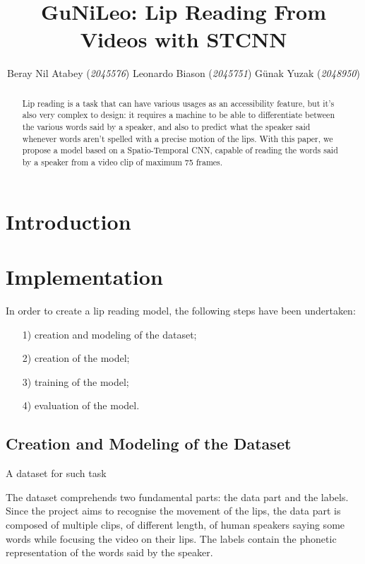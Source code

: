 \documentclass[11pt,journal]{IEEEtran}
\title{GuNiLeo: Lip Reading From Videos with STCNN}
\author{Beray Nil Atabey (\textit{2045576}) \quad Leonardo Biason (\textit{2045751}) \quad Günak Yuzak (\textit{2048950})}
\begin{document}
\maketitle

\begin{abstract}
    Lip reading is a task that can have various usages as an accessibility feature, but it's also very complex to design: it requires a machine to be able to differentiate between the various words said by a speaker, and also to predict what the speaker said whenever words aren't spelled with a precise motion of the lips. With this paper, we propose a model based on a Spatio-Temporal CNN, capable of reading the words said by a speaker from a video clip of maximum 75 frames.
\end{abstract}

\section{Introduction}

\lipsum[1]

\section{Implementation}

In order to create a lip reading model, the following steps have been undertaken:
\begin{itemize}
    \item [1)] creation and modeling of the dataset;
    \item [2)] creation of the model;
    \item [3)] training of the model;
    \item [4)] evaluation of the model.
\end{itemize}

\subsection{Creation and Modeling of the Dataset}

A dataset for such task 

The dataset comprehends two fundamental parts: the data part and the labels. Since the project aims to recognise the movement of the lips, the data part is composed of multiple clips, of different length, of human speakers saying some words while focusing the video on their lips. The labels contain the phonetic representation of the words said by the speaker. 
\end{document}
